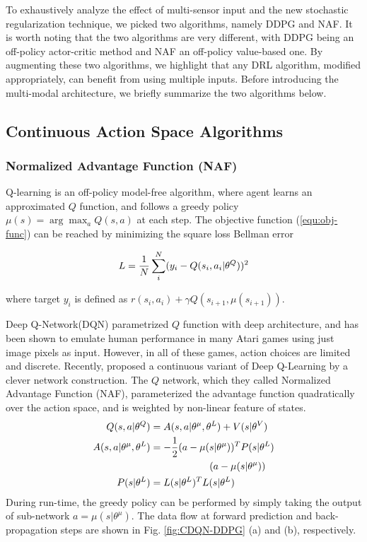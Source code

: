 \documentclass[../thesis.tex]{subfiles}
\begin{document}
To exhaustively analyze the effect of multi-sensor input and the new stochastic regularization technique, we picked two algorithms, namely DDPG and NAF. It is worth noting that the two algorithms are very different, with DDPG being an off-policy actor-critic method and NAF an off-policy value-based one. By augmenting these two algorithms, we highlight that any DRL algorithm, modified appropriately, can benefit from using multiple inputs. Before introducing the multi-modal architecture, we briefly summarize the two algorithms below.


\subsection{Continuous Action Space Algorithms}

\subsubsection{Normalized Advantage Function (NAF)} 
\label{sec:CDQN}

Q-learning \cite{sutton1999policy} is an off-policy model-free algorithm, where agent learns an approximated $Q$ function, and follows a greedy policy $\mu(s)=\arg\max_aQ(s,a)$ at each step. The objective function (\ref{equ:obj-func}) can be reached by minimizing the square loss Bellman error

\begin{align}
\centering
L = \frac{1}{N} \sum_i^N (y_i-Q(s_i,a_i|\theta^Q))^2
\end{align}

where target $y_i$ is defined as $r(s_i,a_i) + \gamma Q(s_{i+1},\mu(s_{i+1}))$.


Deep Q-Network(DQN) parametrized $Q$ function with deep architecture\cite{mnih2013playing}, and has been shown to emulate human performance \cite{mnih2015human} in many Atari games using just image pixels as input. However, in all of these games, action choices are limited and discrete. Recently, \citet{CDQN} proposed a continuous variant of Deep Q-Learning by a clever network construction. The $Q$ network, which they called Normalized Advantage Function (NAF), parameterized the advantage function quadratically over the action space, and is weighted by non-linear feature of states. 
\begin{align}
\centering
Q(s,a|\theta^Q) &= A(s,a | \theta^\mu, \theta^L) + V(s|\theta^V) \\
A(s,a | \theta^\mu, \theta^L) &= -\frac{1}{2}(a-\mu(s|\theta^\mu))^T P(s|\theta^L)\nonumber \\
&\qquad \qquad \qquad(a-\mu(s|\theta^\mu)) \label{equ:NAF} \\
P(s|\theta^L) &= L(s|\theta^L)^TL(s|\theta^L) \label{equ:P}
\end{align}
During run-time, the greedy policy can be performed by simply taking the output of sub-network $a = \mu(s|\theta^\mu)$. The data flow at forward prediction and back-propagation steps are shown in Fig. \ref{fig:CDQN-DDPG} (a) and (b), respectively.
\end{document}
